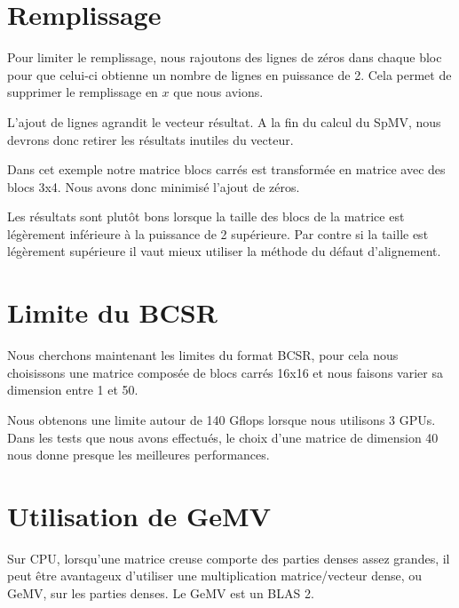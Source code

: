 \documentclass[a4paper,11pt]{report}
\begin{document}
 \section{Remplissage}
  Pour limiter le remplissage, nous rajoutons des lignes de zéros dans
  chaque bloc pour que celui-ci obtienne un nombre de lignes en
  puissance de 2. Cela permet de supprimer le remplissage en $x$ que
  nous avions.
  
  L'ajout de lignes agrandit le vecteur résultat. A la fin du calcul du
  SpMV, nous devrons donc retirer les résultats inutiles du vecteur.


  Dans cet exemple notre matrice blocs carrés est transformée en matrice
  avec des blocs 3x4. Nous avons donc minimisé l'ajout de zéros.
  
  
  Les résultats sont plutôt bons lorsque la taille des blocs de la
  matrice est légèrement inférieure à la puissance de 2 supérieure. Par
  contre si la taille est légèrement supérieure il vaut mieux utiliser
  la méthode du défaut d'alignement.

 \section{Limite du BCSR}
  Nous cherchons maintenant les limites du format BCSR, pour cela nous
  choisissons une matrice composée de blocs carrés 16x16 et nous
  faisons varier sa dimension entre 1 et 50.


  Nous obtenons une limite autour de 140 Gflops lorsque nous utilisons
  3 GPUs. Dans les tests que nous avons effectués, le choix d'une
  matrice de dimension 40 nous donne presque les meilleures performances.

 \section{Utilisation de GeMV}
  Sur CPU, lorsqu'une matrice creuse comporte des parties denses assez
  grandes, il peut être avantageux d'utiliser une multiplication
  matrice/vecteur dense, ou GeMV, sur les parties denses. Le GeMV est
  un BLAS 2.
\end{document}
